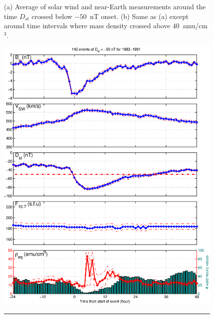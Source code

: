 \documentclass[10pt,twocolumn]{article}
\begin{document}
\begin{figure}[tp!]
\caption{(a) Average of solar wind and near-Earth measurements around the time $D_{st}$ crossed below $-50$~nT onset. (b) Same as (a) except around time intervals where mass density crossed above $40$~amu/cm$^3$.}
\label{Storms}
\end{figure}

\begin{figure}[tp!]
\centering
\includegraphics[scale=0.40]{paperfigures/stormavs-dd12.eps}
\rule[1ex]{5cm}{1pt}

\end{figure}
\end{document}
